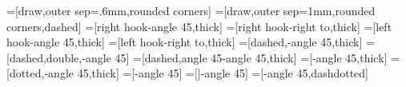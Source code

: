 \usetikzlibrary{arrows}
\newcommand{\mmtarrowtip}{angle 45}
\newcommand{\mmtreversearrowtip}{angle 45 reversed}
\newcommand{\mmtarrowtipepi}{triangle 45}
\newcommand{\mmtarrowtipmonoright}{right hook}
\newcommand{\mmtarrowtipmonoleft}{left hook}
\newcommand{\mmtarrowtippartial}{right to}
\newcommand\mmtthy[3]{\def\@test{#3}%
\begin{array}{l}\textsf{#1}\\\hline #2\ifx\@test\@empty\message{empty!}\else\message{nonempty!}\\\hline #3\fi\end{array}}
=[draw,outer sep=.6mm,rounded corners]
=[draw,outer sep=1mm,rounded corners,dashed]
=[\mmtarrowtipmonoright-\mmtarrowtip,thick]
=[\mmtarrowtipmonoright-\mmtarrowtippartial,thick]
=[\mmtarrowtipmonoleft-\mmtarrowtip,thick]
=[\mmtarrowtipmonoleft-\mmtarrowtippartial,thick]
=[dashed,-\mmtarrowtip,thick]
=[dashed,double,-\mmtarrowtip]
=[dashed,\mmtarrowtip-\mmtarrowtip,thick]
=[-\mmtarrowtip,thick]
=[dotted,-\mmtarrowtip,thick]
=[-\mmtarrowtip] %
=[|-\mmtarrowtip] %
=[-\mmtarrowtip,dashdotted] %


